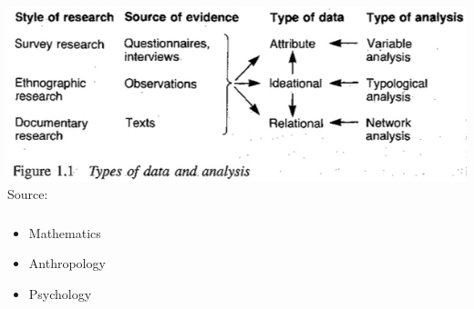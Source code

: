 \documentclass[8pt]{beamer}
\begin{document}

\begin{frame}
\frametitle{\insertsection}

\centering
\includegraphics[width=0.8\linewidth,height=0.5\textheight,keepaspectratio]{scott}\\
\tiny Source: \cite{Scott2000}

\end{frame}



\begin{frame}
\frametitle{\insertsection}

\begin{itemize}
	\item Mathematics
	\item Anthropology
	\item Psychology
\end{itemize}

\end{frame}

\end{document}
